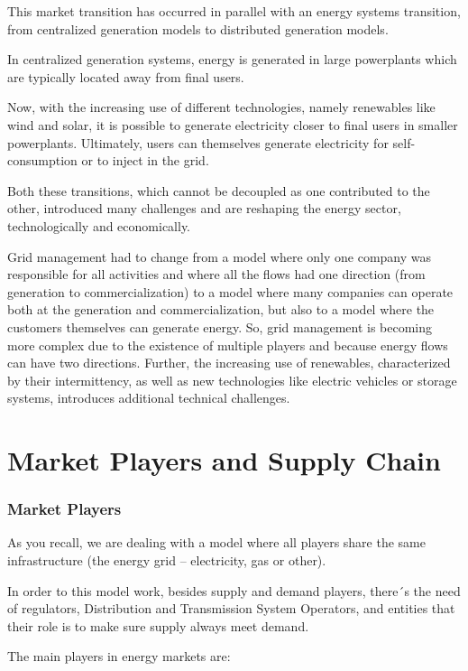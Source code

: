 \documentclass[]{book}
\theoremstyle{definition}
\theoremstyle{definition}
\theoremstyle{definition}
\theoremstyle{remark}
\begin{document}
This market transition has occurred in parallel with an energy systems
transition, from centralized generation models to distributed generation
models.

In centralized generation systems, energy is generated in large
powerplants which are typically located away from final users.

Now, with the increasing use of different technologies, namely
renewables like wind and solar, it is possible to generate electricity
closer to final users in smaller powerplants. Ultimately, users can
themselves generate electricity for self-consumption or to inject in the
grid.

Both these transitions, which cannot be decoupled as one contributed to
the other, introduced many challenges and are reshaping the energy
sector, technologically and economically.

Grid management had to change from a model where only one company was
responsible for all activities and where all the flows had one direction
(from generation to commercialization) to a model where many companies
can operate both at the generation and commercialization, but also to a
model where the customers themselves can generate energy. So, grid
management is becoming more complex due to the existence of multiple
players and because energy flows can have two directions. Further, the
increasing use of renewables, characterized by their intermittency, as
well as new technologies like electric vehicles or storage systems,
introduces additional technical challenges.

\section{Market Players and Supply
Chain}\label{market-players-and-supply-chain}

\subsubsection{Market Players}\label{market-players}

As you recall, we are dealing with a model where all players share the
same infrastructure (the energy grid -- electricity, gas or other).

In order to this model work, besides supply and demand players, there´s
the need of regulators, Distribution and Transmission System Operators,
and entities that their role is to make sure supply always meet demand.

The main players in energy markets are:
\end{document}

